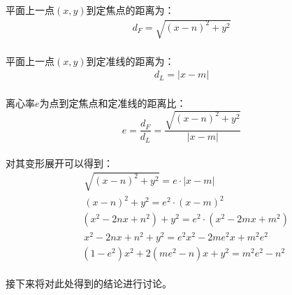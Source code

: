 \documentclass[UTF8]{ctexart}
\begin{document}
    平面上一点$(x,y)$到定焦点的距离为：
    \begin{align}
        d_F=\sqrt{(x-n)^2+y^2}
    \end{align}\\
    平面上一点$(x,y)$到定准线的距离为：
    \begin{align}
        d_L=|x-m|
    \end{align}\\
    离心率$e$为点到定焦点和定准线的距离比：
    \begin{equation}
        e=\frac{d_F}{d_L}=\frac{\sqrt{(x-n)^2+y^2}}{|x-m|}
    \end{equation}\\[1mm]
    对其变形展开可以得到：
    \begin{align}
        &~\sqrt{(x-n)^2+y^2}=e\cdot|x-m|\\[5mm]
        &~(x-n)^2+y^2=e^2\cdot(x-m)^2\\[5mm]
        &\left(x^2-2nx+n^2\right)+y^2=e^2\cdot\left(x^2-2mx+m^2\right)\\[5mm]
        &~x^2-2nx+n^2+y^2=e^2x^2-2me^2x+m^2e^2\\[5mm]
        &\left(1-e^2\right)x^2+2\left(me^2-n\right)x+y^2=m^2e^2-n^2
    \end{align}\\
    接下来将对此处得到的结论进行讨论。\\[6mm]

\newpage
\end{document}
